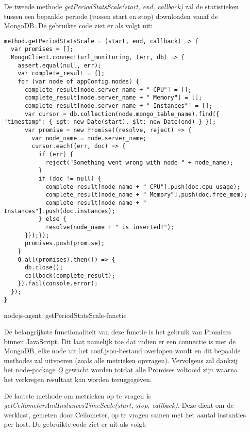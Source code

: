 De tweede methode \textit{getPeriodStatsScale(start, end, callback)} zal de statistieken tussen een bepaalde periode (tussen start en stop) downloaden vanaf de MongoDB. De gebruikte code ziet er als volgt uit:

\begin{code}
\begin{verbatim}
method.getPeriodStatsScale = (start, end, callback) => {
  var promises = [];
  MongoClient.connect(url_monitoring, (err, db) => {
    assert.equal(null, err);
    var complete_result = {};
    for (var node of appConfig.nodes) {
      complete_result[node.server_name + " CPU"] = [];
      complete_result[node.server_name + " Memory"] = [];
      complete_result[node.server_name + " Instances"] = [];
      var cursor = db.collection(node.mongo_table_name).find({ "timestamp": { $gt: new Date(start), $lt: new Date(end) } });
      var promise = new Promise((resolve, reject) => {
        var node_name = node.server_name;
        cursor.each((err, doc) => {
          if (err) {
            reject("Something went wrong with node " + node_name);
          }
          if (doc != null) {
            complete_result[node_name + " CPU"].push(doc.cpu_usage);
            complete_result[node_name + " Memory"].push(doc.free_mem);
            complete_result[node_name + " Instances"].push(doc.instances);
          } else {
            resolve(node_name + " is inserted!");
      }});});
      promises.push(promise);
    }
    Q.all(promises).then(() => {
      db.close();
      callback(complete_result);
    }).fail(console.error);
  });
}
\end{verbatim}
\caption{nodejs-agent: getPeriodStatsScale-functie}
\end{code}

De belangrijkste functionaliteit van deze functie is het gebruik van Promises binnen JavaScript. Dit laat namelijk toe dat indien er een connectie is met de MongoDB, elke node uit het conf.json-bestand overlopen wordt en dit bepaalde methodes zal uitvoeren (zoals alle metrieken opvragen). Vervolgens zal dankzij het node-package \textit{Q} gewacht worden totdat alle Promises voltooid zijn waarna het verkregen resultaat kan worden teruggegeven.

De laatste methode om metrieken op te vragen is \textit{getCeilometerAndInstancesTimeScale(start, stop, callback)}. Deze dient om de werklast, gemeten door Ceilometer, op te vragen samen met het aantal instanties per host. De gebruikte code ziet er uit als volgt:

